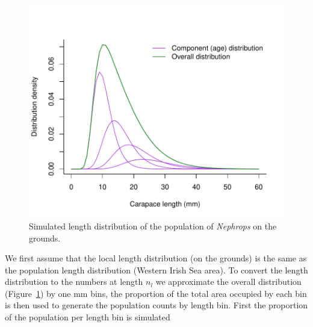 \documentclass[12pt]{article}\usepackage[]{graphicx}\usepackage[]{color}
\makeatletter
\def\maxwidth{ %
  \ifdim\Gin@nat@width>\linewidth
    \linewidth
  \else
    \Gin@nat@width
  \fi
}
\newenvironment{knitrout}{}{} %
\makeatother
\begin{document}
\begin{knitrout}
\begin{figure}
{\centering \includegraphics[width=\maxwidth]{figure/popl-1} 

}

\caption[Simulated length distribution of the population of \emph{Nephrops} on the grounds]{Simulated length distribution of the population of \emph{Nephrops} on the grounds.}\label{fig:popl}
\end{figure}


\end{knitrout}
We first assume that the local length distribution (on the grounds) is the same as the population length distribution (Western Irish Sea area). To convert the length distribution to the numbers at length $n_l$ we approximate the overall distribution (Figure~\ref{fig:popl}) by one mm bins, the proportion of the total area occupied by each bin is then used to generate the population counts by length bin. First the proportion of the population per length bin is simulated
\end{document}
